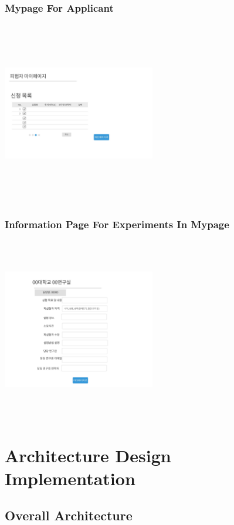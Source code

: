 \documentclass[letterpaper, 10 pt, conference]{ieeeconf}  %
\begin{document}
\subsubsection{Mypage For Applicant}
\includegraphics[width=0.5\textwidth,height = 8cm]{Oven_ver2/19_myPageForApplicant.jpg}

\subsubsection{Information Page For Experiments In Mypage}
\includegraphics[width=0.5\textwidth,height = 8cm]{Oven_ver2/20_detailedInformationInMypage.jpg}



\section{Architecture Design  Implementation }

\subsection{Overall Architecture}
\end{document}
